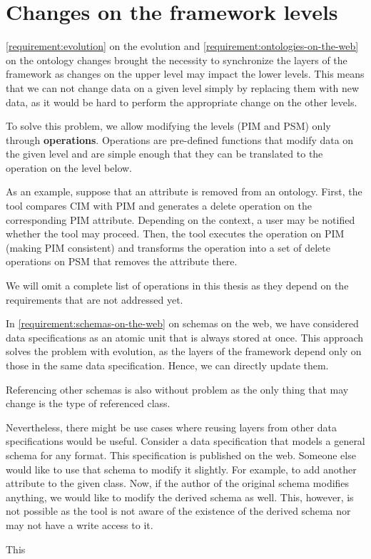 \section{Changes on the framework levels}

\autoref{requirement:evolution} on the evolution and \autoref{requirement:ontologies-on-the-web} on the ontology changes brought the necessity to synchronize the layers of the framework as changes on the upper level may impact the lower levels. This means that we can not change data on a given level simply by replacing them with new data, as it would be hard to perform the appropriate change on the other levels.

To solve this problem, we allow modifying the levels (PIM and PSM) only through \textbf{operations}. Operations are pre-defined functions that modify data on the given level and are simple enough that they can be translated to the operation on the level below.

As an example, suppose that an attribute is removed from an ontology. First, the tool compares CIM with PIM and generates a delete operation on the corresponding PIM attribute. Depending on the context, a user may be notified whether the tool may proceed. Then, the tool executes the operation on PIM (making PIM consistent) and transforms the operation into a set of delete operations on PSM that removes the attribute there.

We will omit a complete list of operations in this thesis as they depend on the requirements that are not addressed yet.

\medskip

In \autoref{requirement:schemas-on-the-web} on schemas on the web, we have considered data specifications as an atomic unit that is always stored at once. This approach solves the problem with evolution, as the layers of the framework depend only on those in the same data specification. Hence, we can directly update them.

Referencing other schemas is also without problem as the only thing that may change is the type of referenced class.

\smallskip

Nevertheless, there might be use cases where reusing layers from other data specifications would be useful. Consider a data specification that models a general schema for any format. This specification is published on the web. Someone else would like to use that schema to modify it slightly. For example, to add another attribute to the given class. Now, if the author of the original schema modifies anything, we would like to modify the derived schema as well. This, however, is not possible as the tool is not aware of the existence of the derived schema nor may not have a write access to it.

This


